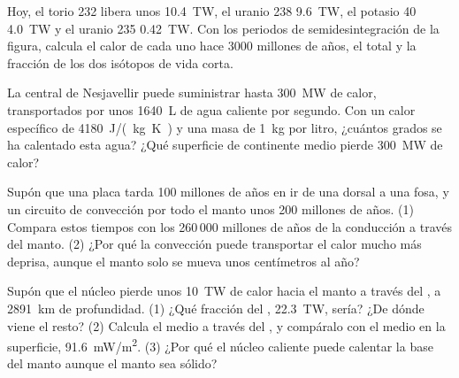 \begin{exercise}[$\star\star\star$]\label{exo:g12:internal-heat:12}
Hoy, el torio 232 libera unos \qty{10.4}{TW}, el uranio 238 \qty{9.6}{TW},
el potasio 40 \qty{4.0}{TW} y el uranio 235 \qty{0.42}{TW}. Con los periodos
de semidesintegración de la figura, calcula el calor de
cada uno hace 3000 millones de años, el total y la fracción de los dos
isótopos de vida corta.
\end{exercise}

\begin{exercise}[$\star\star\star$]\label{exo:g12:internal-heat:13}
La central de Nesjavellir puede suministrar hasta \qty{300}{MW} de calor,
transportados por unos \qty{1640}{L} de agua caliente por segundo. Con un
calor específico de \qty{4180}{J/(kg.K)} y una masa de \qty{1}{kg} por litro,
¿cuántos grados se ha calentado esta agua? ¿Qué superficie de continente medio
pierde \qty{300}{MW} de calor?
\end{exercise}

\begin{exercise}[$\star\star\star$]\label{exo:g12:internal-heat:14}
Supón que una placa tarda 100 millones de años en ir de una dorsal a una fosa,
y un circuito de convección por todo el manto unos 200 millones de años. (1)
Compara estos tiempos con los 260\,000 millones de años de la conducción a
través del manto. (2) ¿Por qué la convección puede transportar el calor
mucho más deprisa, aunque el manto solo se mueva unos centímetros al año?
\end{exercise}

\begin{exercise}[$\star\star\star$]\label{exo:g12:internal-heat:15}
Supón que el núcleo pierde unos \qty{10}{TW} de calor hacia el manto a
través del , a \qty{2891}{km} de profundidad. (1) ¿Qué
fracción del , \qty{22.3}{TW}, sería? ¿De dónde viene el
resto? (2) Calcula el  medio a través del
, y compáralo con el  medio en la superficie,
\qty{91.6}{mW/m^2}. (3) ¿Por qué el núcleo caliente puede calentar la base
del manto aunque el manto sea sólido?
\end{exercise}

